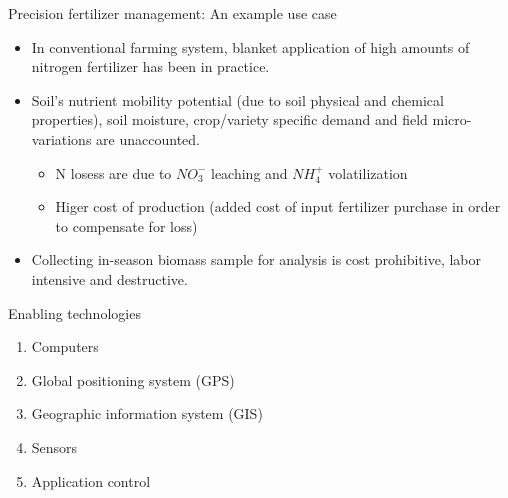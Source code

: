 \documentclass[11pt,dvipsnames,ignorenonframetext,aspectratio=169]{beamer}
\providecommand{\tightlist}{%
  \setlength{\itemsep}{0pt}\setlength{\parskip}{0pt}}
\begin{document}
\begin{frame}{Precision fertilizer management: An example use case}
\protect\hypertarget{precision-fertilizer-management-an-example-use-case}{}
\begin{itemize}
\tightlist
\item
  In conventional farming system, blanket application of high amounts of
  nitrogen fertilizer has been in practice.
\item
  Soil's nutrient mobility potential (due to soil physical and chemical
  properties), soil moisture, crop/variety specific demand and field
  micro-variations are unaccounted.

  \begin{itemize}
  \tightlist
  \item
    N losess are due to \(NO^{-}_3\) leaching and \(NH^{+}_4\)
    volatilization
  \item
    Higer cost of production (added cost of input fertilizer purchase in
    order to compensate for loss)
  \end{itemize}
\item
  Collecting in-season biomass sample for analysis is cost prohibitive,
  labor intensive and destructive.
\end{itemize}
\end{frame}

\begin{frame}{Enabling technologies}
\protect\hypertarget{enabling-technologies}{}
\begin{enumerate}
\tightlist
\item
  Computers
\item
  Global positioning system (GPS)
\item
  Geographic information system (GIS)
\item
  Sensors
\item
  Application control
\end{enumerate}
\end{frame}
\end{document}
